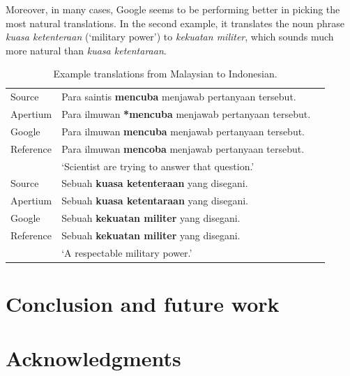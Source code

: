 \documentclass[10pt,a5paper,twoside]{article}
\begin{document}
Moreover, in many cases, Google seems to be performing better in picking the most natural translations. In the second example, it translates the noun phrase \emph{kuasa ketenteraan} (`military power') to \emph{kekuatan militer}, which sounds much more natural than \emph{kuasa ketentaraan}.

\begin{table}[htbp]
  \begin{center}
  \begin{tabular}{llc}
  \toprule
  Source & Para saintis \textbf{mencuba} menjawab pertanyaan tersebut.\\
  Apertium & Para ilmuwan \textbf{*mencuba} menjawab pertanyaan tersebut.\\
  Google & Para ilmuwan \textbf{mencuba} menjawab pertanyaan tersebut.\\
  Reference & Para ilmuwan \textbf{mencoba} menjawab pertanyaan tersebut.\\
  & `Scientist are trying to answer that question.'\\
  \midrule
  Source & Sebuah \textbf{kuasa ketenteraan} yang disegani.\\
  Apertium & Sebuah \textbf{kuasa ketentaraan} yang disegani.\\
  Google & Sebuah \textbf{kekuatan militer} yang disegani.\\
  Reference & Sebuah \textbf{kekuatan militer} yang disegani.\\
  & `A respectable military power.'\\
  \bottomrule
  \end{tabular}
    \caption{Example translations from Malaysian to Indonesian.}
    \label{table:ex}
  \end{center}
\end{table}

\section*{Conclusion and future work}

\section*{Acknowledgments}




\end{document}
